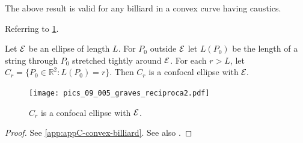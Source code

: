   The  above result is valid for any billiard in a convex curve having caustics. 
 
Referring to \cref{fig:09-reciproca-graves}.
      
\begin{proposition}
   Let $\mathcal{E}$ be an ellipse of length $L$.
   For $P_0$  outside $\mathcal{E}$ let $L(P_0)$   be the length of a string through $P_0$ stretched tightly around $\mathcal{E}$. For each $r>L$, let $C_r=\{P_0\in\mathbb{R}^2: L(P_0)=r\}.$  Then $C_r$ is a confocal ellipse with $\mathcal{E}.$ 
\label{prop:09-caustic}
\end{proposition} 
      
\begin{figure}
\begin{center}
\texttt{[image: pics\_09\_005\_graves\_reciproca2.pdf]}
\caption{$C_r$ is a confocal  ellipse with $\mathcal{E}$.}
\end{center}
\label{fig:09-reciproca-graves}
\end{figure}

\begin{proof} See \cref{app:appC-convex-billiard}. 
See also \cite[page 14]{akopyan2007-conics}.
\end{proof}